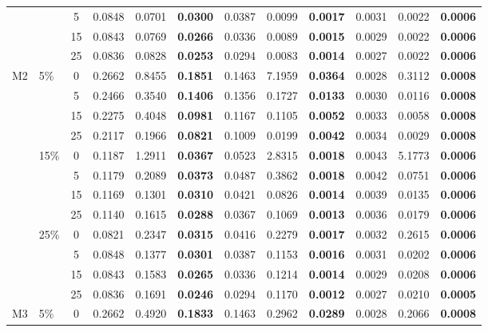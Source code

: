\documentclass[a4paper,fleqn]{cas-sc}
\numberwithin{equation}{section}
\begin{document}
\begin{table}[width=.99\linewidth,cols=4,pos=b]
\begin{tabular}{llc rrr rrr rrr}
& & 5  & 0.0848 & 0.0701 & \textbf{0.0300} & 0.0387 & 0.0099 & \textbf{0.0017} & 0.0031 & 0.0022 & \textbf{0.0006} \\
& & 15 & 0.0843 & 0.0769 & \textbf{0.0266} & 0.0336 & 0.0089 & \textbf{0.0015} & 0.0029 & 0.0022 & \textbf{0.0006} \\
& & 25 & 0.0836 & 0.0828 & \textbf{0.0253} & 0.0294 & 0.0083 & \textbf{0.0014} & 0.0027 & 0.0022 & \textbf{0.0006} \\
\midrule
\multirow{12}{*}{M2}
& \multirow{4}{*}{5\%}
& 0  & 0.2662 & 0.8455 & \textbf{0.1851} & 0.1463 & 7.1959 & \textbf{0.0364} & 0.0028 & 0.3112 & \textbf{0.0008} \\
& & 5  & 0.2466 & 0.3540 & \textbf{0.1406} & 0.1356 & 0.1727 & \textbf{0.0133} & 0.0030 & 0.0116 & \textbf{0.0008} \\
& & 15 & 0.2275 & 0.4048 & \textbf{0.0981} & 0.1167 & 0.1105 & \textbf{0.0052} & 0.0033 & 0.0058 & \textbf{0.0008} \\
& & 25 & 0.2117 & 0.1966 & \textbf{0.0821} & 0.1009 & 0.0199 & \textbf{0.0042} & 0.0034 & 0.0029 & \textbf{0.0008} \\
\cmidrule(lr){2-12}
& \multirow{4}{*}{15\%}
& 0  & 0.1187 & 1.2911 & \textbf{0.0367} & 0.0523 & 2.8315 & \textbf{0.0018} & 0.0043 & 5.1773 & \textbf{0.0006} \\
& & 5  & 0.1179 & 0.2089 & \textbf{0.0373} & 0.0487 & 0.3862 & \textbf{0.0018} & 0.0042 & 0.0751 & \textbf{0.0006} \\
& & 15 & 0.1169 & 0.1301 & \textbf{0.0310} & 0.0421 & 0.0826 & \textbf{0.0014} & 0.0039 & 0.0135 & \textbf{0.0006} \\
& & 25 & 0.1140 & 0.1615 & \textbf{0.0288} & 0.0367 & 0.1069 & \textbf{0.0013} & 0.0036 & 0.0179 & \textbf{0.0006} \\
\cmidrule(lr){2-12}
& \multirow{4}{*}{25\%}
& 0  & 0.0821 & 0.2347 & \textbf{0.0315} & 0.0416 & 0.2279 & \textbf{0.0017} & 0.0032 & 0.2615 & \textbf{0.0006} \\
& & 5  & 0.0848 & 0.1377 & \textbf{0.0301} & 0.0387 & 0.1153 & \textbf{0.0016} & 0.0031 & 0.0202 & \textbf{0.0006} \\
& & 15 & 0.0843 & 0.1583 & \textbf{0.0265} & 0.0336 & 0.1214 & \textbf{0.0014} & 0.0029 & 0.0208 & \textbf{0.0006} \\
& & 25 & 0.0836 & 0.1691 & \textbf{0.0246} & 0.0294 & 0.1170 & \textbf{0.0012} & 0.0027 & 0.0210 & \textbf{0.0005} \\
\midrule
\multirow{12}{*}{M3}
& \multirow{4}{*}{5\%}
& 0  & 0.2662 & 0.4920 & \textbf{0.1833} & 0.1463 & 0.2962 & \textbf{0.0289} & 0.0028 & 0.2066 & \textbf{0.0008} \\

\end{tabular}
\end{table}
\end{document}
